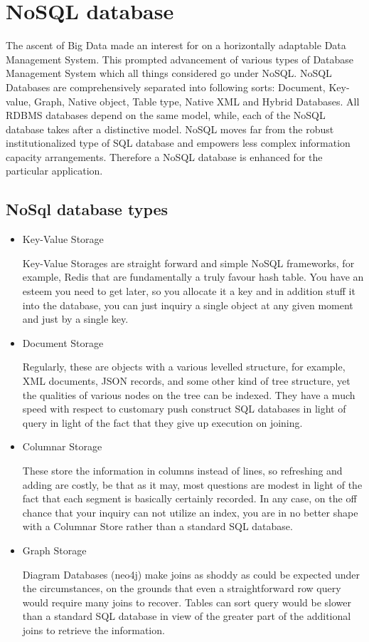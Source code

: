 \section{NoSQL database}
The ascent of Big Data made an interest for on a horizontally adaptable Data Management System. This prompted advancement of various types of Database Management System which all things considered go under NoSQL. NoSQL Databases are comprehensively separated into following sorts: Document, Key-value, Graph, Native object, Table type, Native XML and Hybrid Databases. All RDBMS databases depend on the same model, while, each of the NoSQL database takes after a distinctive model. NoSQL moves far from the robust institutionalized type of SQL database and empowers less complex information capacity arrangements. Therefore a NoSQL database is enhanced for the particular application.\cite{noSql}

\subsection{NoSql database types}

\begin{itemize}
\item Key-Value Storage \par
Key-Value Storages are straight forward and simple NoSQL frameworks, for example, Redis that are fundamentally a truly favour hash table. You have an esteem you need to get later, so you allocate it a key and in addition stuff it into the database, you can just inquiry a single object at any given moment and just by a single key.

\item Document Storage \par
Regularly, these are objects with a various levelled structure, for example, XML documents, JSON records, and some other kind of tree structure, yet the qualities of various nodes on the tree can be indexed. They have a much speed with respect to customary push construct SQL databases in light of query in light of the fact that they give up execution on joining. 

\item Columnar Storage  \par
These store the information in columns instead of lines, so refreshing and adding are costly, be that as it may, most questions are modest in light of the fact that each segment is basically certainly recorded. In any case, on the off chance that your inquiry can not utilize an index, you are in no better shape with a Columnar Store rather than a standard SQL database.

\item Graph Storage  \par
Diagram Databases (neo4j) make joins as shoddy as could be expected under the circumstances, on the grounds that even a straightforward row query would require many joins to recover. Tables can sort query would be slower than a standard SQL database in view of the greater part of the additional joins to retrieve the information. \cite{DataTypes}
\end{itemize}

